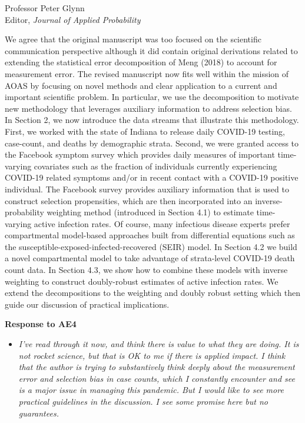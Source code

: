 \documentclass[11pt]{letter} %
\begin{document}
\begin{letter}{Professor
	Peter Glynn\\
	Editor, {\em Journal of Applied Probability}}
\begin{itemize}
\vspace{5mm}
We agree that the original manuscript was too focused on the scientific communication perspective although it did contain original derivations related to extending the statistical error decomposition of Meng (2018) to account for measurement error.  The revised manuscript now fits well within the mission of AOAS by focusing on novel methods and clear application to a current and important scientific problem. In particular, we use the decomposition to motivate new methodology that leverages auxiliary information to address selection bias. In Section 2, we now introduce the data streams that illustrate this methodology. First, we worked with the state of Indiana to release daily COVID-19 testing, case-count, and deaths by demographic strata. Second, we were granted access to the Facebook symptom survey which provides daily measures of important time-varying covariates such as the fraction of individuals currently experiencing COVID-19 related symptoms and/or in recent contact with a COVID-19 positive individual.  The Facebook survey provides auxiliary information that is used to construct selection propensities, which are then incorporated into an inverse-probability weighting method (introduced in Section 4.1) to estimate time-varying active infection rates. Of course, many infectious disease experts prefer compartmental model-based approaches built from differential equations such as the susceptible-exposed-infected-recovered (SEIR) model.  In Section 4.2 we build a novel compartmental model to take advantage of strata-level COVID-19 death count data.  In Section 4.3, we show how to combine these models with inverse weighting to construct doubly-robust estimates of active infection rates.  We extend the decompositions to the weighting and doubly robust setting which then guide our discussion of practical implications.
\vspace{5mm}

\end{itemize}
\newpage

{\bf Response to AE4}
\begin{itemize}
\item {\it I’ve read through it now, and think there is value to what they are doing.  It is not rocket science, but that is OK to me if there is applied impact. I think that the author is trying to substantively think deeply about the measurement error and selection bias in case counts, which I constantly encounter and see is a major issue in managing this pandemic.  But I would like to see more practical guidelines in the discussion.  I see some promise here but no guarantees.}


\end{itemize}
\end{letter}
\end{document}
